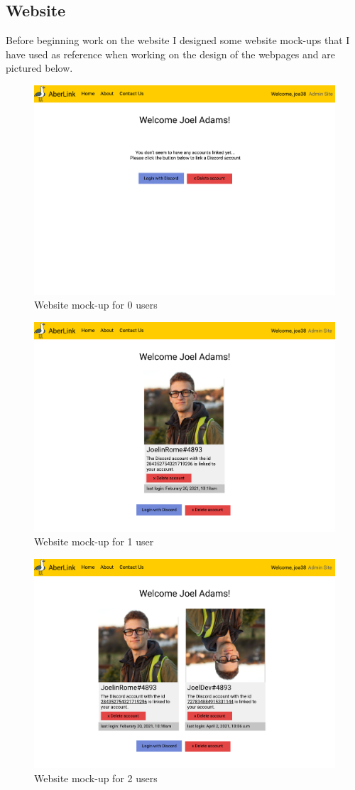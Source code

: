\subsection{Website}
Before beginning work on the website I designed some website mock-ups that I have used as reference when working on the design of the webpages and are pictured below.
\begin{figure}[H]
	\centering
	\includegraphics[width=0.8\linewidth]{Figures/AberLink-web-0}
	\caption{Website mock-up for 0 users}
	\label{fig:web-mock-0}
\end{figure}
\begin{figure}[H]
	\centering
	\includegraphics[width=0.8\linewidth]{Figures/AberLink-web-1}
	\caption{Website mock-up for 1 user}
	\label{fig:web-mock-1}
\end{figure}
\begin{figure}[H]
	\centering
	\includegraphics[width=0.8\linewidth]{Figures/AberLink-web-2}
	\caption{Website mock-up for 2 users}
	\label{fig:web-mock-2}
\end{figure}


